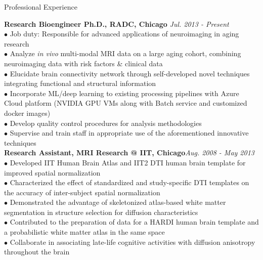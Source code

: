 \documentclass{resume} %
\begin{document}
\begin{rSection}{Professional Experience}

{\bf Research Bioengineer Ph.D., RADC, Chicago } \hfill {\em Jul. 2013 - Present} \\
$\bullet$ Job duty: Responsible for advanced applications of neuroimaging in aging research\\
$\bullet$ Analyze {\em in vivo} multi-modal MRI data on a large aging cohort, combining neuroimaging data with risk factors \& clinical data\\
$\bullet$ Elucidate brain connectivity network through self-developed novel techniques integrating functional and structural information\\
$\bullet$ Incorporate ML/deep learning to existing processing pipelines with Azure Cloud platform (NVIDIA GPU VMs along with Batch service and customized docker images)\\
$\bullet$ Develop quality control procedures for analysis methodologies\\
$\bullet$ Supervise and train staff in appropriate use of the aforementioned innovative techniques\\

{\bf Research Assistant, MRI Research @ IIT, Chicago}\hfill {\em Aug. 2008 - May 2013} \\
$\bullet$ Developed IIT Human Brain Atlas and IIT2 DTI human brain template for improved spatial normalization\\
$\bullet$ Characterized the effect of standardized and study-specific DTI templates on the accuracy of inter-subject spatial normalization\\
$\bullet$ Demonstrated the advantage of skeletonized atlas-based white matter segmentation in structure selection for diffusion characteristics\\
$\bullet$ Contributed to the preparation of data for a HARDI human brain template and a probabilistic white matter atlas in the same space\\
$\bullet$ Collaborate in associating late-life cognitive activities with diffusion anisotropy throughout the brain

\end{rSection}

\newpage
\end{document}
